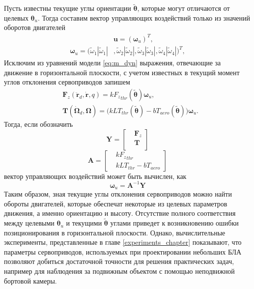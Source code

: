 Пусть известны текущие углы ориентации $\tilde {\bm {\theta}}$, которые могут отличаются от целевых $\bm \theta_u$.
Тогда составим вектор управляющих воздействий только из значений оборотов двигателей
\begin{equation} \label{eq:m_cut_ctrl_out}
\begin{aligned}
&\bm{u} = (\bm \omega_u)^T,
\\
\bm \omega_u =
(\tilde\omega_1 |\tilde\omega_1|&,
\tilde\omega_2 |\tilde\omega_2|,
\tilde\omega_3 |\tilde\omega_3|,
\tilde\omega_4 |\tilde\omega_4|)^T,
\end{aligned}
\end{equation}
Исключим из уравнений модели \eqref{eq:m_dyn} выражения, отвечающие за движение в горизонтальной плоскости, с учетом известных в текущий момент углов отклонения сервоприводов запишем
\begin{equation} \label{eq:m_cut_dyn}
\begin{aligned}
&\bm F_z(\ddot{\bm r}_d, \dot{\bm r}, q) =
k {F_z}_{thr} (\tilde{\bm \theta}) \bm \omega_u,\\
&\bm T(\dot{\bm \Omega}_d, \bm\Omega) =
\Big(
kLT_{thr}(\tilde{\bm \theta}) - bT_{aero}(\tilde{\bm \theta})
\Big)
\bm \omega_u.
\end{aligned}
\end{equation}
Тогда, если обозначить
\begin{equation}
\bm Y = 
\begin{bmatrix}
&\bm F_z \\
&\bm T \\
\end{bmatrix}
\end{equation}
\begin{equation}
\bm A = 
\begin{bmatrix}
&k {F_z}_{thr} \\
&kLT_{thr} - bT_{aero}
\end{bmatrix}
\end{equation}
вектор управляющих воздействий может быть вычислен, как
\begin{equation}
\bm \omega_u = 
\bm A^{-1} \bm Y
\end{equation}
Таким образом, зная текущие углы отклонения сервоприводов можно найти обороты двигателей, которые обеспечат некоторые из целевых параметров движения, а именно ориентацию и высоту. Отсутствие полного соответствия между целевыми $\bm \theta_u$ и текущими $\tilde {\bm \theta}$ углами приведет к возникновению ошибки позиционирования в горизонтальной плоскости. Однако, вычислительные эксперименты, представленные в главе \ref{experiments_chapter} показывают, что параметры сервоприводов, используемых при проектировании небольших БЛА позволяют добиться достаточной точности для решения практических задач, например для наблюдения за подвижным объектом с помощью неподвижной бортовой камеры.

